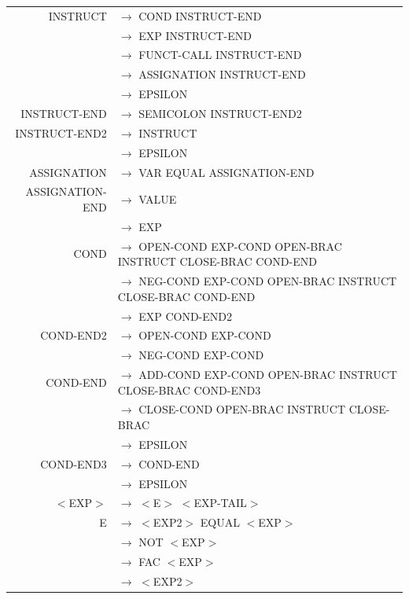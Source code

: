 \documentclass[a4paper,10pt]{article}
\begin{document}
\hspace{-3.5cm}\begin{tabular}{rl}
INSTRUCT			& $\rightarrow$ COND INSTRUCT-END \\					
					& $\rightarrow$ EXP INSTRUCT-END \\					
					& $\rightarrow$ FUNCT-CALL INSTRUCT-END \\					
					& $\rightarrow$ ASSIGNATION INSTRUCT-END \\
					& $\rightarrow$ EPSILON \\

INSTRUCT-END		& $\rightarrow$ SEMICOLON INSTRUCT-END2\\

INSTRUCT-END2		& $\rightarrow$ INSTRUCT\\
					& $\rightarrow$ EPSILON \\
					

ASSIGNATION			& $\rightarrow$ VAR EQUAL ASSIGNATION-END \\

ASSIGNATION-END		& $\rightarrow$ VALUE \\
					& $\rightarrow$ EXP \\
					
COND				& $\rightarrow$ OPEN-COND EXP-COND OPEN-BRAC INSTRUCT CLOSE-BRAC COND-END\\
					& $\rightarrow$ NEG-COND EXP-COND OPEN-BRAC INSTRUCT CLOSE-BRAC COND-END\\
					& $\rightarrow$ EXP COND-END2 \\

COND-END2			& $\rightarrow$ OPEN-COND EXP-COND \\
					& $\rightarrow$ NEG-COND EXP-COND \\


COND-END			& $\rightarrow$ ADD-COND EXP-COND OPEN-BRAC INSTRUCT CLOSE-BRAC COND-END3 \\
					& $\rightarrow$ CLOSE-COND OPEN-BRAC INSTRUCT CLOSE-BRAC\\
					& $\rightarrow$ EPSILON \\	
					
COND-END3			& $\rightarrow$ COND-END \\
					& $\rightarrow$ EPSILON \\					

$<$EXP$>$			& $\rightarrow$ $<$E$>$ $<$EXP-TAIL$>$\\
E					& $\rightarrow$ $<$EXP2$>$ EQUAL $<$EXP$>$\\
					& $\rightarrow$ NOT $<$EXP$>$ \\
					& $\rightarrow$ FAC $<$EXP$>$ \\
					& $\rightarrow$ $<$EXP2$>$ \\


\end{tabular}
\end{document}
